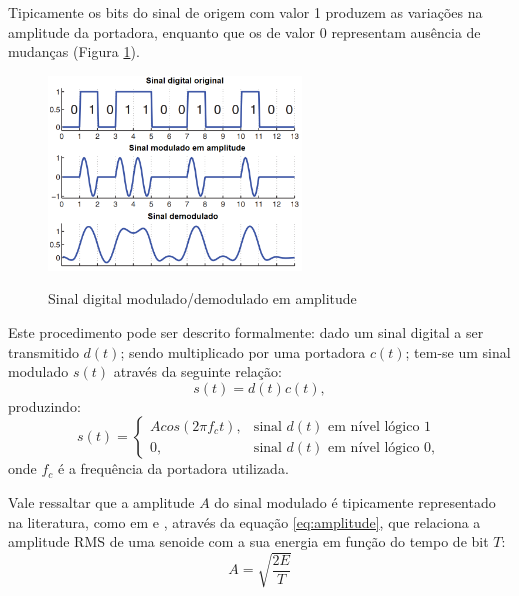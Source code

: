\documentclass[oneside,openright,12pt]{ufsm_2015} %
\begin{document}
Tipicamente os bits do sinal de origem com valor 1 produzem as variações na amplitude da portadora, enquanto que os de valor 0 representam ausência de mudanças (Figura \ref{fig:modam}). 
\begin{figure}[ht]
     \caption{\label{exepretex} Sinal digital modulado/demodulado em amplitude}
\centering
\includegraphics[width=0.6\textwidth]{figuras/modulacao.png}
\vspace{\baselineskip} %
    \label{fig:modam}
\end{figure}
Este procedimento pode ser descrito formalmente: dado um sinal digital a ser transmitido $d(t)$; sendo multiplicado por uma portadora $c(t)$; tem-se um sinal modulado $s(t)$ através da seguinte relação:
\begin{equation}
    s(t) = d(t)c(t),
\end{equation}
produzindo:
\begin{equation}
    s(t) =
\begin{cases}
    Acos(2\pi f_{c}t),& \text{sinal $d(t)$ em nível lógico 1}\\
    0,              & \text{sinal $d(t)$ em nível lógico 0},
\end{cases}
\end{equation}
onde $f_c$ é a frequência da portadora utilizada.

Vale ressaltar que a amplitude $A$ do sinal modulado é tipicamente representado na literatura, como em \cite{book:1681103} e \cite{book:1039396}, através da equação \ref{eq:amplitude}, que relaciona a amplitude RMS de uma senoide com a sua energia em função do tempo de bit $T$:
\begin{equation}\label{eq:amplitude}
    A = \sqrt{\frac{2E}{T}}
\end{equation}

\end{document}
